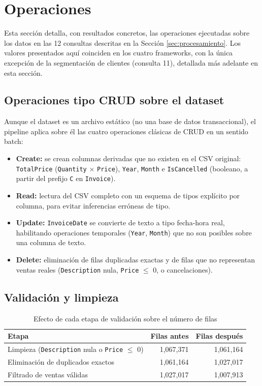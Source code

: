\section{Operaciones}
\label{sec:operaciones}

Esta sección detalla, con resultados concretos, las operaciones ejecutadas sobre los datos en las 12 consultas descritas en la Sección \ref{sec:procesamiento}. Los valores presentados aquí coinciden en los cuatro frameworks, con la única excepción de la segmentación de clientes (consulta 11), detallada más adelante en esta sección.

\subsection{Operaciones tipo CRUD sobre el dataset}

Aunque el dataset es un archivo estático (no una base de datos transaccional), el pipeline aplica sobre él las cuatro operaciones clásicas de CRUD en un sentido batch:

\begin{itemize}
    \item \textbf{Create:} se crean columnas derivadas que no existen en el CSV original: \texttt{TotalPrice} (\texttt{Quantity} $\times$ \texttt{Price}), \texttt{Year}, \texttt{Month} e \texttt{IsCancelled} (booleano, a partir del prefijo \texttt{C} en \texttt{Invoice}).
    \item \textbf{Read:} lectura del CSV completo con un esquema de tipos explícito por columna, para evitar inferencias erróneas de tipo.
    \item \textbf{Update:} \texttt{InvoiceDate} se convierte de texto a tipo fecha-hora real, habilitando operaciones temporales (\texttt{Year}, \texttt{Month}) que no son posibles sobre una columna de texto.
    \item \textbf{Delete:} eliminación de filas duplicadas exactas y de filas que no representan ventas reales (\texttt{Description} nula, \texttt{Price} $\leq$ 0, o cancelaciones).
\end{itemize}

\subsection{Validación y limpieza}

\begin{table}[H]
\centering
\begin{tabular}{lrr}
\toprule
\textbf{Etapa} & \textbf{Filas antes} & \textbf{Filas después} \\
\midrule
Limpieza (\texttt{Description} nula o \texttt{Price} $\leq$ 0) & 1{,}067{,}371 & 1{,}061{,}164 \\
Eliminación de duplicados exactos & 1{,}061{,}164 & 1{,}027{,}017 \\
Filtrado de ventas válidas & 1{,}027{,}017 & 1{,}007{,}913 \\
\bottomrule
\end{tabular}
\caption{Efecto de cada etapa de validación sobre el número de filas}
\end{table}

